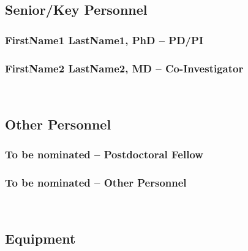 \subsection*{Senior/Key Personnel}

\subsubsection*{FirstName1 LastName1, PhD -- PD/PI}
\lipsum[66]

\subsubsection*{FirstName2 LastName2, MD -- Co-Investigator}

\lipsum[66]

~

\subsection*{Other Personnel}

\subsubsection*{To be nominated -- Postdoctoral Fellow} 

\lipsum[66]

\subsubsection*{To be nominated -- Other Personnel}

\lipsum[66]

~

\subsection*{Equipment}

\lipsum[66] 

